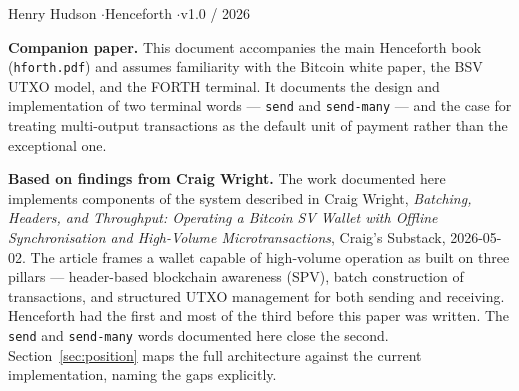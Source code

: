 \documentclass[a4paper, 11pt]{article}
\begin{document}

\vspace*{5.5cm}

\begin{flushright}
\textcolor{forthGrey}{\small Henry Hudson \quad\(\cdot\)\quad Henceforth \quad\(\cdot\)\quad v1.0 / 2026}
\end{flushright}

\vspace{0.4cm}

\begin{notebox}
\textbf{Companion paper.} This document accompanies the main Henceforth book (\texttt{hforth.pdf}) and assumes familiarity with the Bitcoin white paper, the BSV UTXO model, and the FORTH terminal. It documents the design and implementation of two terminal words --- \texttt{send} and \texttt{send-many} --- and the case for treating multi-output transactions as the default unit of payment rather than the exceptional one.
\end{notebox}

\begin{notebox}
\textbf{Based on findings from Craig Wright.} The work documented here implements components of the system described in Craig Wright, \emph{Batching, Headers, and Throughput: Operating a Bitcoin SV Wallet with Offline Synchronisation and High-Volume Microtransactions}, Craig's Substack, 2026-05-02. The article frames a wallet capable of high-volume operation as built on three pillars --- header-based blockchain awareness (SPV), batch construction of transactions, and structured UTXO management for both sending and receiving. Henceforth had the first and most of the third before this paper was written. The \texttt{send} and \texttt{send-many} words documented here close the second. Section~\ref{sec:position} maps the full architecture against the current implementation, naming the gaps explicitly.
\end{notebox}
\end{document}
